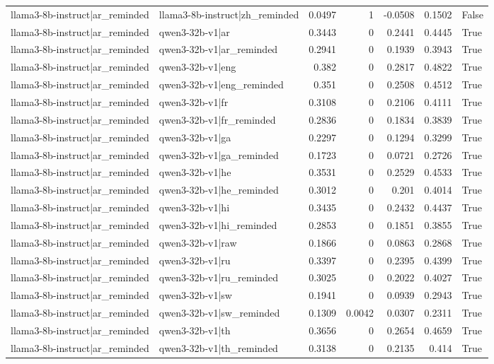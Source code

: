 \begin{table}
\begin{tabular}{l l r r r r l}
llama3-8b-instruct|ar_reminded & llama3-8b-instruct|zh_reminded & 0.0497 & 1 & -0.0508 & 0.1502 & False \\
llama3-8b-instruct|ar_reminded & qwen3-32b-v1|ar & 0.3443 & 0 & 0.2441 & 0.4445 & True \\
llama3-8b-instruct|ar_reminded & qwen3-32b-v1|ar_reminded & 0.2941 & 0 & 0.1939 & 0.3943 & True \\
llama3-8b-instruct|ar_reminded & qwen3-32b-v1|eng & 0.382 & 0 & 0.2817 & 0.4822 & True \\
llama3-8b-instruct|ar_reminded & qwen3-32b-v1|eng_reminded & 0.351 & 0 & 0.2508 & 0.4512 & True \\
llama3-8b-instruct|ar_reminded & qwen3-32b-v1|fr & 0.3108 & 0 & 0.2106 & 0.4111 & True \\
llama3-8b-instruct|ar_reminded & qwen3-32b-v1|fr_reminded & 0.2836 & 0 & 0.1834 & 0.3839 & True \\
llama3-8b-instruct|ar_reminded & qwen3-32b-v1|ga & 0.2297 & 0 & 0.1294 & 0.3299 & True \\
llama3-8b-instruct|ar_reminded & qwen3-32b-v1|ga_reminded & 0.1723 & 0 & 0.0721 & 0.2726 & True \\
llama3-8b-instruct|ar_reminded & qwen3-32b-v1|he & 0.3531 & 0 & 0.2529 & 0.4533 & True \\
llama3-8b-instruct|ar_reminded & qwen3-32b-v1|he_reminded & 0.3012 & 0 & 0.201 & 0.4014 & True \\
llama3-8b-instruct|ar_reminded & qwen3-32b-v1|hi & 0.3435 & 0 & 0.2432 & 0.4437 & True \\
llama3-8b-instruct|ar_reminded & qwen3-32b-v1|hi_reminded & 0.2853 & 0 & 0.1851 & 0.3855 & True \\
llama3-8b-instruct|ar_reminded & qwen3-32b-v1|raw & 0.1866 & 0 & 0.0863 & 0.2868 & True \\
llama3-8b-instruct|ar_reminded & qwen3-32b-v1|ru & 0.3397 & 0 & 0.2395 & 0.4399 & True \\
llama3-8b-instruct|ar_reminded & qwen3-32b-v1|ru_reminded & 0.3025 & 0 & 0.2022 & 0.4027 & True \\
llama3-8b-instruct|ar_reminded & qwen3-32b-v1|sw & 0.1941 & 0 & 0.0939 & 0.2943 & True \\
llama3-8b-instruct|ar_reminded & qwen3-32b-v1|sw_reminded & 0.1309 & 0.0042 & 0.0307 & 0.2311 & True \\
llama3-8b-instruct|ar_reminded & qwen3-32b-v1|th & 0.3656 & 0 & 0.2654 & 0.4659 & True \\
llama3-8b-instruct|ar_reminded & qwen3-32b-v1|th_reminded & 0.3138 & 0 & 0.2135 & 0.414 & True \\

\end{tabular}
\end{table}
